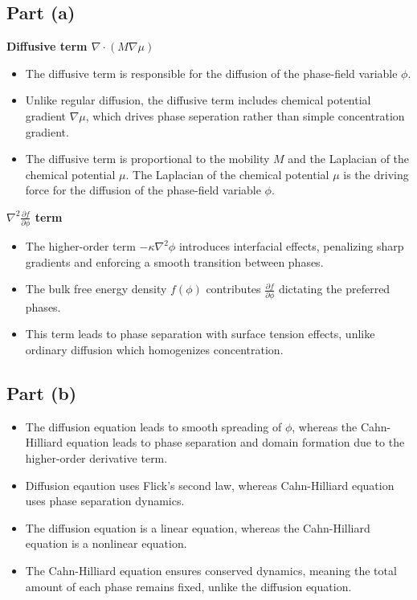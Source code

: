 \documentclass[12pt]{article}
\begin{document}
\subsection*{Part (a)}
\textbf{Diffusive term $\nabla \cdot (M \nabla \mu)$}
\begin{itemize}
    \item The diffusive term is responsible for the diffusion of the phase-field variable $\phi$. 
    \item Unlike regular diffusion, the diffusive term includes chemical potential gradient $\nabla \mu$, which drives phase seperation rather than simple concentration gradient.
    \item The diffusive term is proportional to the mobility $M$ and the Laplacian of the chemical potential $\mu$. The Laplacian of the chemical potential $\mu$ is the driving force for the diffusion of the phase-field variable $\phi$. 
\end{itemize} 
\textbf{$\nabla^2 \frac{\partial f}{\partial \phi}$ term}
\begin{itemize}
    \item The higher-order term $-\kappa \nabla^2 \phi$ introduces interfacial effects, penalizing sharp gradients and enforcing a smooth transition between phases.
    \item The bulk free energy density $f(\phi)$ contributes $\frac{\partial f}{\partial \phi}$ dictating the preferred phases.
    \item This term leads to phase separation with surface tension effects, unlike ordinary diffusion which homogenizes concentration.
\end{itemize}

\subsection*{Part (b)}
\begin{itemize}
    \item The diffusion equation leads to smooth spreading of $\phi$, whereas the Cahn-Hilliard equation leads to phase separation and domain formation due to the higher-order derivative term.
    \item Diffusion eqaution uses Flick's second law, whereas Cahn-Hilliard equation uses phase separation dynamics.
    \item The diffusion equation is a linear equation, whereas the Cahn-Hilliard equation is a nonlinear equation.
    \item The Cahn-Hilliard equation ensures conserved dynamics, meaning the total amount of each phase remains fixed, unlike the diffusion equation.
\end{itemize}
\end{document}

